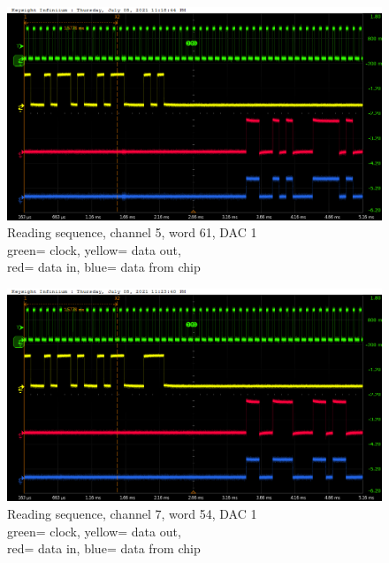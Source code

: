 \begin{figure}[H]
	\centering
	\includegraphics[width=0.6\linewidth]{IMG/ch5/probe/09-08-2021_ch05-read61-baselinedac1}
	\caption{Reading sequence, channel 5, word 61, DAC 1\\{\color{green}green}= clock, {\color{yellow}yellow}= data out,\\{\color{red}red}= data in, {\color{blue}blue}= data from chip}
	\label{fig:ch05write61}
\end{figure}

\begin{figure}[H]
	\centering
	\includegraphics[width=0.6\linewidth]{IMG/ch5/probe/09-08-2021_ch07-read54-baselinedac1}
	\caption{Reading sequence, channel 7, word 54, DAC 1\\{\color{green}green}= clock, {\color{yellow}yellow}= data out,\\{\color{red}red}= data in, {\color{blue}blue}= data from chip}
	\label{fig:ch07write54}
\end{figure}